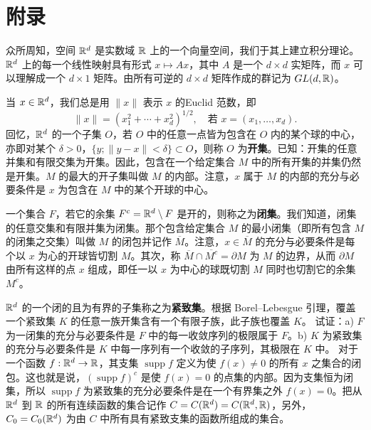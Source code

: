 \chapter*{附录}
众所周知，空间 $\mathbb R^d$ 是实数域 $\mathbb R$ 上的一个向量空间，我们于其上建立积分理论。$\mathbb R^d$ 上的每一个线性映射具有形式 $x\mapsto Ax$，其中 $A$ 是一个 $d\times d$ 实矩阵，而 $x$ 可以理解成一个 $d\times1$ 矩阵。由所有可逆的 $d\times d$ 矩阵作成的群记为 $GL(d,\mathbb R)$。

当 $x\in\mathbb R^d$，我们总是用 $\|x\|$ 表示 $x$ 的Euclid 范数，即
\[\|x\|=(x_1^2+\cdots+x_d^2)^{1/2},\quad\text{若 }x=(x_1,\ldots,x_d).\]
回忆，$\mathbb R^d$ 的一个子集 $O$，若 $O$ 中的任意一点皆为包含在 $O$ 内的某个球的中心，亦即对某个 $\delta>0$，$\{y;\|y-x\|<\delta\}\subset O$，则称 $O$ 为\textbf{开集}。已知：开集的任意并集和有限交集为开集。因此，包含在一个给定集合 $M$ 中的所有开集的并集仍然是开集。$M$ 的最大的开子集叫做 $M$ 的内部。注意，$x$ 属于 $M$ 的内部的充分与必要条件是 $x$ 为包含在 $M$ 中的某个开球的中心。

一个集合 $F$，若它的余集 $F^c=\mathbb R^d\setminus F$ 是开的，则称之为\textbf{闭集}。我们知道，闭集的任意交集和有限并集为闭集。那个包含给定集合 $M$ 的最小闭集（即所有包含 $M$ 的闭集之交集）叫做 $M$ 的闭包并记作 $\overline M$。注意，$x\in\overline M$ 的充分与必要条件是每个以 $x$ 为心的开球皆切割 $M$。其次，称 $\overline M\cap\overline{M^c}=\partial M$ 为 $M$ 的边界，从而 $\partial M$ 由所有这样的点 $x$ 组成，即任一以 $x$ 为中心的球既切割 $M$ 同时也切割它的余集 $M^c$。

$\mathbb R^d$ 的一个闭的且为有界的子集称之为\textbf{紧致集}。根据 Borel--Lebesgue 引理，覆盖一个紧致集 $K$ 的任意一族开集含有一个有限子族，此子族也覆盖 $K$。
\Exercise 试证：a) $F$ 为一闭集的充分与必要条件是 $F$ 中的每一收敛序列的极限属于 $F$。b) $K$ 为紧致集的充分与必要条件是 $K$ 中每一序列有一个收敛的子序列，其极限在 $K$ 中。
对于一个函数 $f:\mathbb R^d\to\mathbb R$，其支集 $\operatorname{supp}f$ 定义为使 $f(x)\ne0$ 的所有 $x$ 之集合的闭包。这也就是说，$(\operatorname{supp}f)^c$ 是使 $f(x)=0$ 的点集的内部。因为支集恒为闭集，所以 $\operatorname{supp}f$ 为紧致集的充分必要条件是在一个有界集之外 $f(x)=0$。把从 $\mathbb R^d$ 到 $\mathbb R$ 的所有连续函数的集合记作 $C=C(\mathbb R^d)=C(\mathbb R^d,\mathbb R)$，另外，$C_0=C_0(\mathbb R^d)$ 为由 $C$ 中所有具有紧致支集的函数所组成的集合。

